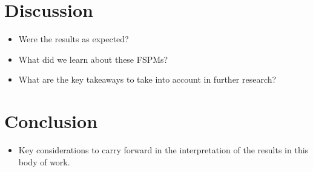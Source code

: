 \section{Discussion}

\begin{itemize}
\item Were the results as expected?
\item What did we learn about these FSPMs?
\item What are the key takeaways to take into account in further research?
\end{itemize}

\section{Conclusion}

\begin{itemize}
\item Key considerations to carry forward in the interpretation of the results in this body of work.
\end{itemize}

